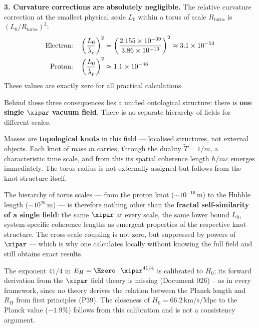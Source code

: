 \textbf{3. Curvature corrections are absolutely negligible.} The relative curvature correction at the smallest physical scale $L_0$ within a torus of scale $R_\text{torus}$ is $(L_0 / R_\text{torus})^2$:
\begin{align}
	\text{Electron:} \quad & \left(\frac{L_0}{\bar\lambda_e}\right)^2 = \left(\frac{2{.}155\times 10^{-39}}{3{.}86\times 10^{-13}}\right)^2 \approx 3{.}1 \times 10^{-53} \notag \\
	\text{Proton:} \quad & \left(\frac{L_0}{\bar\lambda_p}\right)^2 \approx 1{.}1 \times 10^{-46} \notag
\end{align}
These values are exactly zero for all practical calculations.

\begin{keypoint}
Behind these three consequences lies a unified ontological structure: there is \textbf{one single $\xipar$ vacuum field}. There is no separate hierarchy of fields for different scales.

Masses are \textbf{topological knots} in this field — localised structures, not external objects. Each knot of mass $m$ carries, through the duality $\tilde{T} = 1/m$, a characteristic time scale, and from this its spatial coherence length $\hbar/mc$ emerges immediately. The torus radius is not externally assigned but follows from the knot structure itself.

The hierarchy of torus scales — from the proton knot ($\sim 10^{-16}$\,m) to the Hubble length ($\sim 10^{26}$\,m) — is therefore nothing other than the \textbf{fractal self-similarity of a single field}: the same $\xipar$ at every scale, the same lower bound $L_0$, system-specific coherence lengths as emergent properties of the respective knot structure. The cross-scale coupling is not zero, but suppressed by powers of $\xipar$ — which is why one calculates locally without knowing the full field and still obtains exact results.
\end{keypoint}

The exponent $41/4$ in $E_H = \Ezero \cdot \xipar^{41/4}$ is calibrated to $H_0$; its forward derivation from the $\xipar$ field theory is missing (Document 026) -- as in every framework, since no theory derives the relation between the Planck length and $R_H$ from first principles (P39). The closeness of $H_0 = 66{.}2\,\text{km/s/Mpc}$ to the Planck value ($-1{.}9\%$) follows from this calibration and is not a consistency argument.

